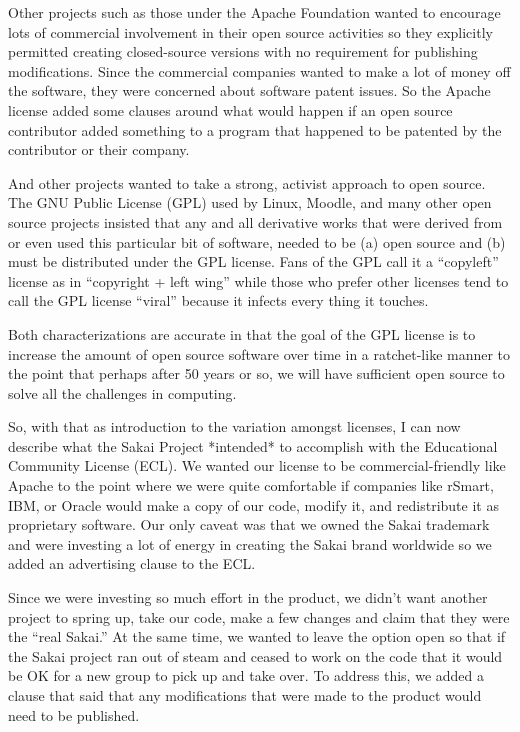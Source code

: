 \documentclass[12pt]{book}
\begin{document}
Other projects such as those under the Apache
Foundation wanted to encourage lots of commercial
involvement in their open source activities so they
explicitly permitted creating closed-source versions
with no requirement for publishing modifications.
Since the commercial companies wanted to make
a lot of money off the software, they were
concerned about software patent issues. So the Apache
license added some clauses around what would
happen if an open source contributor added something
to a program that happened to be patented by the
contributor or their company.

And other projects wanted to take a strong, activist
approach to open source.   The GNU Public License (GPL)
used by Linux, Moodle, and many other
open source projects insisted that any and all
derivative works that were derived from or even used
this particular bit of software, needed to be (a)
open source and (b) must be distributed under the
GPL license.  Fans of the GPL call it a ``copyleft''
license as in ``copyright + left wing'' while
those who prefer other licenses tend to call the
GPL license ``viral'' because it infects every
thing it touches.

Both characterizations are accurate in that the
goal of the GPL license is to increase the amount
of open source software over time in a ratchet-like
manner to the point that perhaps after 50 years or
so, we will have sufficient open source to solve
all the challenges in computing.

So, with that as introduction to the variation
amongst licenses, I can now describe
what the Sakai Project *intended* to accomplish with
the Educational Community License (ECL).  We wanted our
license to be commercial-friendly like Apache
to the point where we were quite comfortable if
companies like rSmart, IBM, or Oracle would make
a copy of our code, modify it, and redistribute
it as proprietary software.  Our only caveat was
that we owned the Sakai trademark and were
investing a lot of energy
in creating the Sakai brand worldwide so we added
an advertising clause to the ECL.

Since we were investing so much effort in
the product, we didn't want another project to
spring up, take our code, make a few changes and claim
that they were the ``real Sakai.''  At the same
time, we wanted to leave the option open so
that if the Sakai project ran out of steam and ceased
to work on the code that it would be OK for a new
group to pick up and take over.  To address this, we added
a clause that said that any modifications that
were made to the product would need to be
published.
\end{document}
